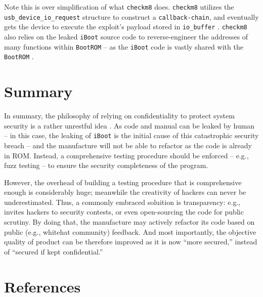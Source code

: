 \documentclass[10pt]{article}
\newcommand{\inlinecode}{\texttt}
\begin{document}
Note this is over simplification of what \inlinecode{checkm8} does. \inlinecode{checkm8} utilizes the \inlinecode{usb\_device\_io\_request} structure to construct a \inlinecode{callback-chain}, and eventually gets the device to execute the exploit's payload stored in \inlinecode{io\_buffer} \cite{cite:4}. \inlinecode{checkm8} also relies on the leaked \inlinecode{iBoot} source code to reverse-engineer the addresses of many functions within \inlinecode{BootROM} -- as the \inlinecode{iBoot} code is vastly shared with the \inlinecode{BootROM} \cite{cite:4}\cite{cite:1}.


\section{Summary}
In summary, the philosophy of relying on confidentiality to protect system security is a rather unrestful idea \cite{cite:1}. As code and manual can be leaked by human -- in this case, the leaking of \inlinecode{iBoot} is the initial cause of this catastrophic security breach -- and the manufacture will not be able to refactor as the code is already in ROM. Instead, a comprehensive testing procedure should be enforced -- e.g., fuzz testing -- to ensure the security completeness of the program.

However, the overhead of building a testing procedure that is comprehensive enough is considerably huge; meanwhile the creativity of hackers can never be underestimated. Thus, a commonly embraced soluition is transparency: e.g., invites hackers to security contests, or even open-sourcing the code for public scrutiny. By doing that, the manufacture may actively refactor its code based on public (e.g., whitehat community) feedback. And most importantly, the objective quality of product can be therefore improved as it is now ``more secured,'' instead of ``secured if kept confidential.''


\newpage
\section{References}

\nocite{*}
\raggedright


\end{document}
